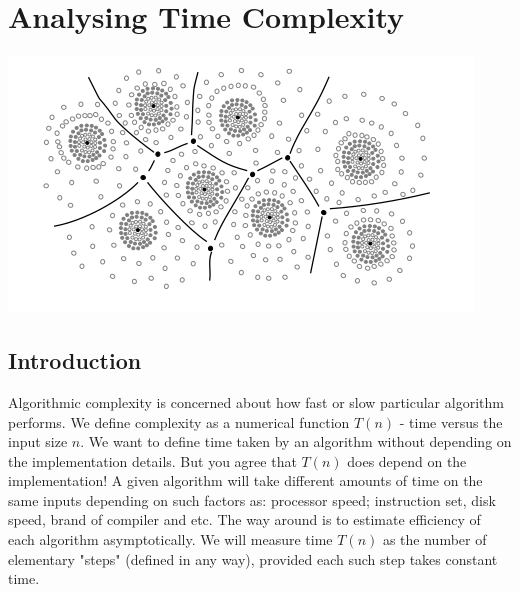 \documentclass[a4paper,12pt]{report}
\begin{document}
\dominitoc \tableofcontents
\listoffigures
{}
\chapter{Analysing Time Complexity}
\includegraphics[scale=0.9]{babu.png}
\minitoc
\newpage
\section{Introduction}
Algorithmic complexity is concerned about how fast or slow particular algorithm
performs. We define complexity as a numerical function $T(n)$ - time versus the
input size $n$. We want to define time taken by an algorithm without depending
on the implementation details. But you agree that $T(n)$ does depend on the
implementation! A given algorithm will take different amounts of time on the
same inputs depending on such factors as: processor speed; instruction set,
disk speed, brand of compiler and etc. The way around is to estimate efficiency
of each algorithm asymptotically. We will measure time $T(n)$ as the number of elementary "steps" (defined in any way), provided each such step takes constant time. 
\\[0.4cm]
\end{document}
